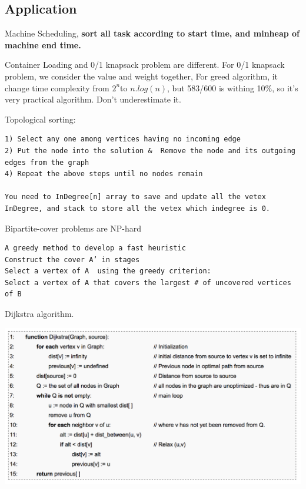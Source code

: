 \documentclass[a4paper,11pt,twoside]{book}
\begin{document}
\subsection{Application}


\par  Machine Scheduling, \textbf{sort all task according to start time, and minheap of machine end time. }

\par Container Loading and 0/1 knapsack problem are different. For 0/1 knapsack problem, we consider the value and weight together,  For greed algorithm, it change time complexity from $2^{n}$to $n.log(n)$, but 583/600 is withing 10\%, so it's very practical algorithm.  Don't underestimate it. 

\par Topological sorting: 
\begin{verbatim}
1) Select any one among vertices having no incoming edge
2) Put the node into the solution &  Remove the node and its outgoing edges from the graph
4) Repeat the above steps until no nodes remain

You need to InDegree[n] array to save and update all the vetex InDegree, and stack to store all the vetex which indegree is 0.  
\end{verbatim}


\par Bipartite-cover problems are NP-hard
\begin{verbatim}
A greedy method to develop a fast heuristic
Construct the cover A’ in stages
Select a vertex of A  using the greedy criterion:
Select a vertex of A that covers the largest # of uncovered vertices of B
\end{verbatim}

\par Dijkstra algorithm.  
\begin{center}
	\includegraphics[scale=0.45]{pics/Dijkstra.png} 
\end{center}
\end{document}
